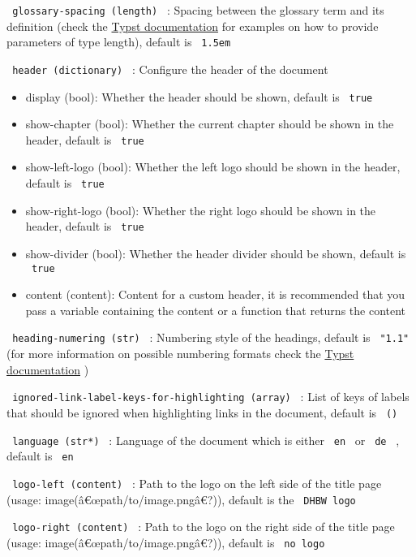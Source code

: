 \texttt{\ glossary-spacing\ (length)\ } : Spacing between the glossary
term and its definition (check the
\href{https://typst.app/docs/reference/layout/length/}{Typst
documentation} for examples on how to provide parameters of type
length), default is \texttt{\ 1.5em\ }

\texttt{\ header\ (dictionary)\ } : Configure the header of the document

\begin{itemize}
\tightlist
\item
  display (bool): Whether the header should be shown, default is
  \texttt{\ true\ }
\item
  show-chapter (bool): Whether the current chapter should be shown in
  the header, default is \texttt{\ true\ }
\item
  show-left-logo (bool): Whether the left logo should be shown in the
  header, default is \texttt{\ true\ }
\item
  show-right-logo (bool): Whether the right logo should be shown in the
  header, default is \texttt{\ true\ }
\item
  show-divider (bool): Whether the header divider should be shown,
  default is \texttt{\ true\ }
\item
  content (content): Content for a custom header, it is recommended that
  you pass a variable containing the content or a function that returns
  the content
\end{itemize}

\texttt{\ heading-numering\ (str)\ } : Numbering style of the headings,
default is \texttt{\ "1.1"\ } (for more information on possible
numbering formats check the
\href{https://typst.app/docs/reference/model/numbering}{Typst
documentation} )

\texttt{\ ignored-link-label-keys-for-highlighting\ (array)\ } : List of
keys of labels that should be ignored when highlighting links in the
document, default is \texttt{\ ()\ }

\texttt{\ language\ (str*)\ } : Language of the document which is either
\texttt{\ en\ } or \texttt{\ de\ } , default is \texttt{\ en\ }

\texttt{\ logo-left\ (content)\ } : Path to the logo on the left side of
the title page (usage: image(â€œpath/to/image.pngâ€?)), default is the
\texttt{\ DHBW\ logo\ }

\texttt{\ logo-right\ (content)\ } : Path to the logo on the right side
of the title page (usage: image(â€œpath/to/image.pngâ€?)), default is
\texttt{\ no\ logo\ }

